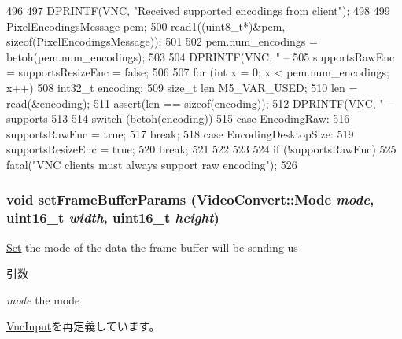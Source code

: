\begin{DoxyCode}
496 {
497     DPRINTF(VNC, "Received supported encodings from client\n");
498 
499     PixelEncodingsMessage pem;
500     read1((uint8_t*)&pem, sizeof(PixelEncodingsMessage));
501 
502     pem.num_encodings = betoh(pem.num_encodings);
503 
504     DPRINTF(VNC, " -- %
505     supportsRawEnc = supportsResizeEnc = false;
506 
507     for (int x = 0; x < pem.num_encodings; x++) {
508         int32_t encoding;
509         size_t len M5_VAR_USED;
510         len = read(&encoding);
511         assert(len == sizeof(encoding));
512         DPRINTF(VNC, " -- supports %
513 
514         switch (betoh(encoding)) {
515           case EncodingRaw:
516             supportsRawEnc = true;
517             break;
518           case EncodingDesktopSize:
519             supportsResizeEnc = true;
520             break;
521         }
522     }
523 
524     if (!supportsRawEnc)
525         fatal("VNC clients must always support raw encoding\n");
526 }
\end{DoxyCode}
\hypertarget{classVncServer_a9abef13e07371ccf4a89883649f1bcc5}{
\subsubsection[{setFrameBufferParams}]{\setlength{\rightskip}{0pt plus 5cm}void setFrameBufferParams ({\bf VideoConvert::Mode} {\em mode}, \/  uint16\_\-t {\em width}, \/  uint16\_\-t {\em height})}}
\label{classVncServer_a9abef13e07371ccf4a89883649f1bcc5}
\hyperlink{classSet}{Set} the mode of the data the frame buffer will be sending us 
\begin{DoxyParams}{引数}
\item[{\em mode}]the mode \end{DoxyParams}


\hyperlink{classVncInput_a9abef13e07371ccf4a89883649f1bcc5}{VncInput}を再定義しています。


